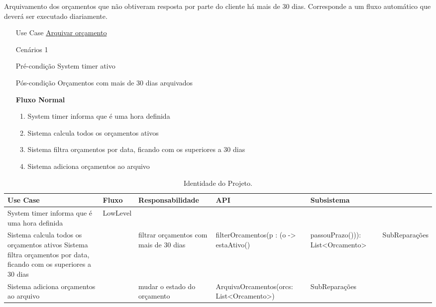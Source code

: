 \documentclass[../relatorio.tex]{subfiles}
\begin{document}
Arquivamento dos orçamentos que não obtiveram resposta por parte do cliente há mais de 30 dias.
Corresponde a um fluxo automático que deverá ser executado diariamente.
\begin{itemize}
    \item[Use Case] {\underline{Arquivar orçamento}}
    \item[Cenários] {1}
    \item[Pré-condição] {System timer ativo}
    \item[Pós-condição] {Orçamentos com mais de 30 dias arquivados}
          \begin{flushleft}
              \textbf{Fluxo Normal}
          \end{flushleft}
          \begin{enumerate}
              \item System timer informa que é uma hora definida
              \item Sistema calcula todos os orçamentos ativos
              \item Sistema filtra orçamentos por data, ficando com os superiores a 30 dias
              \item Sistema adiciona orçamentos ao arquivo
          \end{enumerate}
\end{itemize}
\begin{landscape}
    \begin{table}[!h]
        \centering
        \begin{tabular}{|p{5cm}|p{1cm}|p{4cm}|p{6cm}|p{3cm}|}
            \hline
            Use Case & Fluxo    & Responsabilidade & API & Subsistema    \\
            \hline
            System timer informa que é uma hora definida
                    & LowLevel 
                    &                                        
                    &                                                          
                    &               
            \\
            \hline
            Sistema calcula todos os orçamentos ativos                              
            Sistema filtra orçamentos por data, ficando com os superiores a 30 dias 
                    &          
                    & filtrar orçamentos com mais de 30 dias 
                    & filterOrcamentos(p : (o -> estaAtivo() & passouPrazo())): List<Orcamento> 
                    & SubReparações 
            \\
            \hline
            Sistema adiciona orçamentos ao arquivo                                  
                    &          
                    & mudar o estado do orçamento    
                    & ArquivaOrcamentos(orcs: List<Orcamento>)                        
                    & SubReparações 
            \\
            \hline
        \end{tabular}
        \caption{Identidade do Projeto.}
    \end{table}
\end{landscape}
\end{document}

